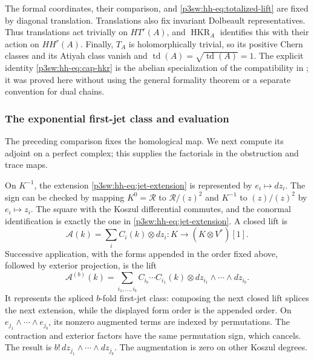 \documentclass[11pt]{article}
\numberwithin{equation}{section}
\begin{document}
The formal coordinates, their comparison, and
\eqref{p3sw:hh-eq:totalized-lift} are fixed by diagonal translation.
Translations also fix invariant Dolbeault representatives.  Thus
translations act trivially on \(HT^r(A)\), and
\(\operatorname{HKR}_A\) identifies this with their action on
\(HH^r(A)\).  Finally, \(T_A\) is holomorphically trivial, so its
positive Chern classes and its Atiyah class vanish and
\(\operatorname{td}(A)=\sqrt{\operatorname{td}(A)}=1\).
The explicit identity \eqref{p3sw:hh-eq:cap-hkr} is the abelian
specialization of the compatibility in
\cite[Theorem~1.4]{P3HHCRVdB}; it was proved here without using the
general formality theorem or a separate convention for dual chains.

\subsubsection{The exponential first-jet class and evaluation}

The preceding comparison fixes the homological map.  We next compute
its adjoint on a perfect complex; this supplies the factorials in the
obstruction and trace maps.

On \(K^{-1}\), the extension
\eqref{p3sw:hh-eq:jet-extension} is represented by
\(e_i\mapsto dz_i\).  The sign can be checked by mapping
\(K^0=\mathcal R\) to \(\mathcal R/(z)^2\) and \(K^{-1}\) to
\((z)/(z)^2\) by \(e_i\mapsto z_i\).  The square with the Koszul
differential commutes, and the conormal identification is exactly the
one in \eqref{p3sw:hh-eq:jet-extension}.  A closed lift is
\[
 \mathcal A(k)=\sum_i C_i(k)\otimes dz_i:
       K\longrightarrow(K\otimes V^*)[1].
\]
Successive application, with the forms appended in the order fixed
above, followed by exterior projection, is the lift
\begin{equation}
 \mathcal A^{(b)}(k)=
 \sum_{i_1,\ldots,i_b}C_{i_b}\cdots C_{i_1}(k)
       \otimes dz_{i_1}\wedge\cdots\wedge dz_{i_b}.
\label{p3sw:hh-eq:jet-power-lift}
\end{equation}
It represents the spliced \(b\)-fold first-jet class: composing the
next closed lift splices the next extension, while the displayed form
order is the appended order.  On
\(e_{j_1}\wedge\cdots\wedge e_{j_b}\), its nonzero augmented terms
are indexed by permutations.  The contraction and exterior factors
have the same permutation sign, which cancels.  The result is
\(b!\,dz_{j_1}\wedge\cdots\wedge dz_{j_b}\).  The augmentation is
zero on other Koszul degrees.
\end{document}
